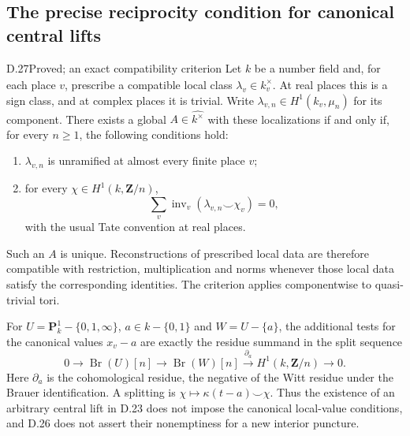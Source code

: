 \subsection{The precise reciprocity condition for canonical central lifts}

\begin{claim}{D.27}{Proved; an exact compatibility criterion}\label{clm:D27}
Let $k$ be a number field and, for each place $v$, prescribe a
compatible local class $\lambda_v\in\widehat{k_v^\times}$.
At real places this is a sign class, and at complex places it
is trivial. Write $\lambda_{v,n}\in H^1(k_v,\mu_n)$ for its
component. There exists a global
$A\in\widehat{k^\times}$ with these localizations if and only
if, for every $n\ge1$, the following conditions hold:
\begin{enumerate}
\item $\lambda_{v,n}$ is unramified at almost every finite
place $v$;
\item for every $\chi\in H^1(k,\mathbf Z/n)$,
\[
 \sum_v\operatorname{inv}_v
       (\lambda_{v,n}\smile\chi_v)=0,                       \tag{D.27.1}
\]
with the usual Tate convention at real places.
\end{enumerate}
Such an $A$ is unique. Reconstructions of prescribed local
data are therefore compatible with restriction, multiplication
and norms whenever those local data satisfy the corresponding
identities. The criterion applies componentwise to
quasi-trivial tori.

For $U=\mathbf P^1_k-\{0,1,\infty\}$,
$a\in k-\{0,1\}$ and $W=U-\{a\}$, the additional tests
for the canonical values $x_v-a$ are exactly the residue
summand in the split sequence
\[
 0\longrightarrow\operatorname{Br}(U)[n]
  \longrightarrow\operatorname{Br}(W)[n]
  \xrightarrow{\partial_a}H^1(k,\mathbf Z/n)
  \longrightarrow0.                                      \tag{D.27.2}
\]
Here $\partial_a$ is the cohomological residue, the negative
of the Witt residue under the Brauer identification. A
splitting is $\chi\mapsto\kappa(t-a)\smile\chi$.
Thus the existence of an arbitrary central lift in D.23 does
not impose the canonical local-value conditions, and D.26
does not assert their nonemptiness for a new interior puncture.
\end{claim}
